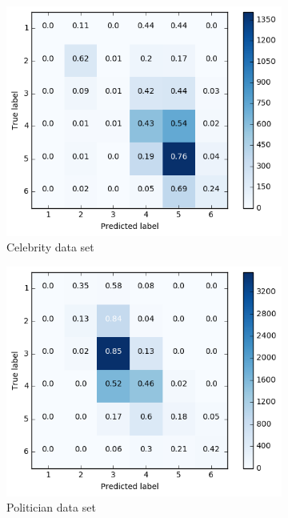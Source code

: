 \begin{figure}[h]
\begin{subfigure}{.4\textwidth}
  \includegraphics[width=.95\linewidth]{img/celeb_lin_cm_favorites}
  \caption{Celebrity data set}
  \label{fig:lin_fav_distr_sub1}
\end{subfigure}%
\begin{subfigure}{.4\textwidth}
  \includegraphics[width=.95\linewidth]{img/polit_lin_cm_favorites}
  \caption{Politician data set}
  \label{fig:lin_fav_distr_sub2}
\end{subfigure}
\begin{subfigure}{.4\textwidth}

\end{subfigure}
\end{figure}
